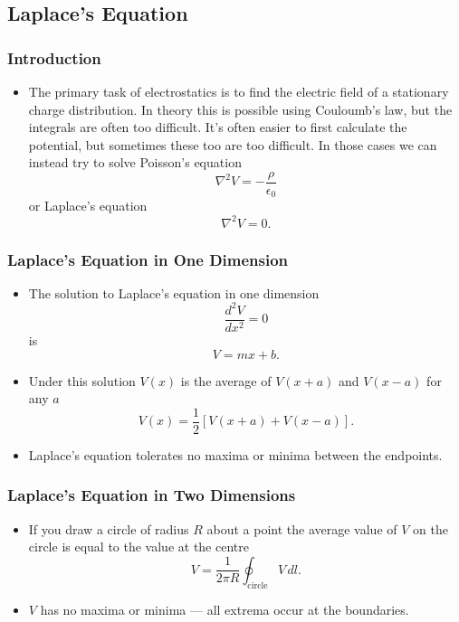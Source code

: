 \documentclass{article}
\begin{document}
\subsection{Laplace's Equation}

\subsubsection{Introduction}

\begin{itemize}
  \item The primary task of electrostatics is to find the electric field of a stationary charge distribution. In theory this is possible using Couloumb's law, but the integrals are often too difficult. It's often easier to first calculate the potential, but sometimes these too are too difficult. In those cases we can instead try to solve Poisson's equation \[\nabla^2 V = -\frac{\rho}{\epsilon_0}\] or Laplace's equation \[\nabla^2 V = 0.\]
\end{itemize}

\subsubsection{Laplace's Equation in One Dimension}

\begin{itemize}
  \item The solution to Laplace's equation in one dimension \[\frac{d^2 V}{d x^2} = 0\] is \[V = m x + b.\]

  \item Under this solution $V(x)$ is the average of $V(x + a)$ and $V(x - a)$ for any $a$ \[V(x) = \frac{1}{2} [V(x + a) + V(x - a)].\]

  \item Laplace's equation tolerates no maxima or minima between the endpoints.
\end{itemize}

\subsubsection{Laplace's Equation in Two Dimensions}

\begin{itemize}
  \item If you draw a circle of radius $R$ about a point the average value of $V$ on the circle is equal to the value at the centre \[V = \frac{1}{2 \pi R} \oint_\text{circle} V \,d l.\]

  \item $V$ has no maxima or minima — all extrema occur at the boundaries.
\end{itemize}
\end{document}
